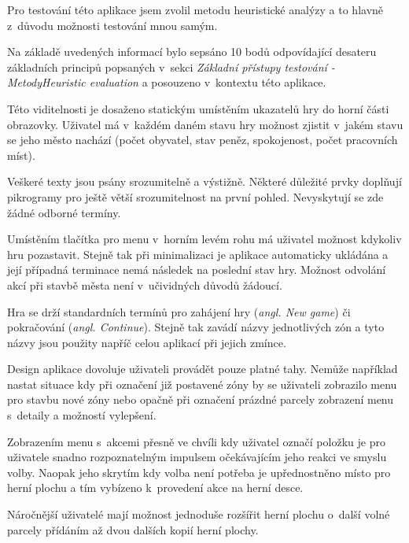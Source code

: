 \documentclass[twoside,12pt]{article}
\begin{document}
Pro testování této aplikace jsem zvolil metodu heuristické analýzy a to hlavně z~důvodu možnosti testování mnou samým.

Na základě uvedených informací bylo sepsáno 10 bodů odpovídající desateru základních principů popsaných v~sekci \textit{Základní přístupy testování - MetodyHeuristic evaluation} a posouzeno v~kontextu této aplikace.

Této viditelnosti je dosaženo statickým umístěním ukazatelů hry do horní části obrazovky. Uživatel má v~každém daném stavu hry možnost zjistit v~jakém stavu se jeho město nachází (počet obyvatel, stav peněz, spokojenost, počet pracovních míst).

Veškeré texty jsou psány srozumitelně a výstižně. Některé důležité prvky doplňují pikrogramy pro ještě větší srozumitelnost na první pohled. Nevyskytují se zde žádné odborné termíny.

Umístěním tlačítka pro menu v~horním levém rohu má uživatel možnost kdykoliv hru pozastavit. Stejně tak při minimalizaci je aplikace automaticky ukládána a její případná terminace nemá následek na poslední stav hry. Možnost odvolání akcí při stavbě města není v~učividných důvodů žádoucí.

Hra se drží standardních termínů pro zahájení hry (\textit{angl. New game}) či pokračování (\textit{angl. Continue}). Stejně tak zavádí názvy jednotlivých zón a tyto názvy jsou použity napříč celou aplikací při jejich zmínce.

Design aplikace dovoluje uživateli provádět pouze platné tahy. Nemůže například nastat situace kdy při označení již postavené zóny by se uživateli zobrazilo menu pro stavbu nové zóny nebo opačně při označení prázdné parcely zobrazení menu s~detaily a možností vylepšení. 

Zobrazením menu s~akcemi přesně ve chvíli kdy uživatel označí položku je pro uživatele snadno rozpoznatelným impulsem očekávajícím jeho reakci ve smyslu volby. Naopak jeho skrytím kdy volba není potřeba je upřednostněno místo pro herní plochu a tím vybízeno k~provedení akce na herní desce.

Náročnější uživatelé mají možnost jednoduše rozšířit herní plochu o~další volné parcely přídáním až dvou dalších kopií herní plochy.
\end{document}
